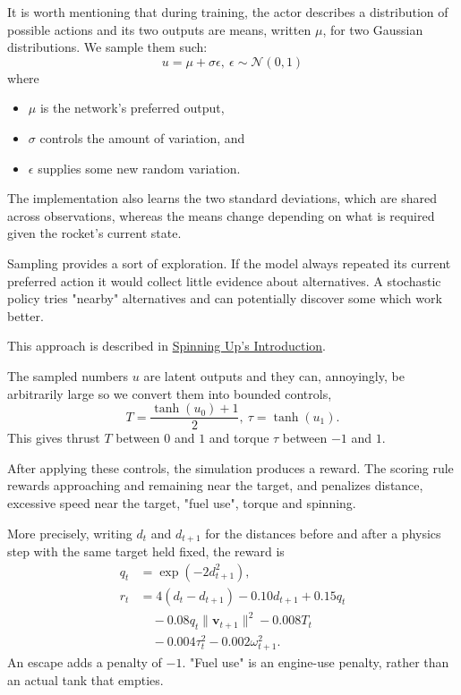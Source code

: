 \documentclass[12pt, letterpaper]{article}
\begin{document}
It is worth mentioning that 
during training, the actor describes 
a distribution of possible actions and its 
two outputs are means, written $\mu$, for 
two Gaussian distributions. We sample them such: 
\[
    u = \mu + \sigma \epsilon, \ \epsilon \sim \mathcal N(0,1)
\]
where 
\begin{itemize}
    \item $\mu$ is the network's preferred output, 
    \item $\sigma$ controls the amount of variation, and 
    \item $\epsilon$ supplies some new random variation.
\end{itemize}

The implementation also 
learns the two standard deviations, which are shared 
across observations, whereas 
the means change depending on what is required 
given the rocket's current state. 

Sampling provides a sort of 
exploration. If the model always repeated 
its current preferred action it would 
collect little evidence about alternatives. 
A stochastic policy tries "nearby" alternatives 
and can potentially discover some 
which work better. 

This approach is described in 
\href{https://spinningup.openai.com/en/latest/spinningup/rl_intro.html}{Spinning Up's Introduction}.

The sampled numbers $u$ are 
latent outputs and they can, 
annoyingly, be arbitrarily large so we convert 
them into bounded controls, 
\[
    T = \frac{\tanh(u_0) + 1}{2}, \ \tau = \tanh(u_1).
\]
This gives thrust $T$ between $0$ and $1$ and 
torque $\tau$ between $-1$ and $1$. 

After applying these controls, the 
simulation produces a reward. 
The scoring rule rewards 
approaching and remaining near the target, and 
penalizes distance, excessive speed near the target, 
"fuel use", torque and spinning. 

More precisely, writing $d_t$ and $d_{t+1}$ for the distances
before and after a physics step with the same target held fixed,
the reward is
\begin{align*}
    q_t &= \exp(-2d_{t+1}^2),\\
    r_t &= 4(d_t-d_{t+1}) - 0.10d_{t+1} + 0.15q_t\\
        &\quad - 0.08q_t\|\mathbf v_{t+1}\|^2 - 0.008T_t\\
        &\quad - 0.004\tau_t^2 - 0.002\omega_{t+1}^2.
\end{align*}
An escape adds a penalty of $-1$. "Fuel use" is an engine-use
penalty, rather than an actual tank that empties.
\end{document}

